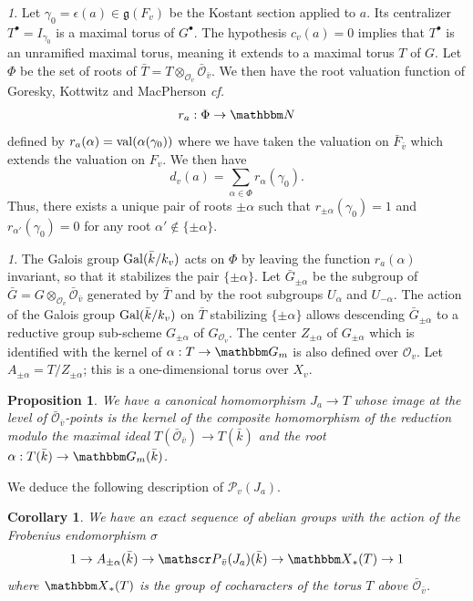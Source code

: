 \documentclass[12pt,english]{smfart}
\numberwithin{equation}{subsection}
\newtheorem{proposition}[equation]{Proposition}
\newtheorem{corollaire}[equation]{Corollary}
\theoremstyle{remark}
\newtheorem{numero}[equation]{}
\newcommand\calP{{\mathscr P}}
\newcommand\calO{{\mathscr O}}
\newcommand\frakg{{\mathfrak g}}
\newcommand\GG{{\mathbbm G}}
\newcommand\NN{{\mathbbm N}}
\newcommand\bbX{{\mathbbm X}}
\newcommand\Gal{{\rm Gal}}
\newcommand\cf{{\it cf.\ }}
\begin{document}
\begin{numero}
Let $\gamma_0=\epsilon(a)\in \frakg(F_v)$ be the Kostant section
applied to $a$. Its centralizer $T^\bullet=I_{\gamma_0}$ is a maximal
torus of $G^\bullet$. The hypothesis $c_v(a)=0$ implies that
$T^\bullet$ is an unramified maximal torus, meaning it extends to a
maximal torus $T$ of $G$. Let $\Phi$ be the set of roots of $\bar
T=T\otimes_{\calO_v} {\bar\calO_{\bar v}}$. We then have the root
valuation function of Goresky, Kottwitz and MacPherson \cf
\cite{GKM-codim}
$$r_a:\Phi\rightarrow \NN$$
defined by $r_a(\alpha)={\rm val}(\alpha(\gamma_0))$ where we have taken the
valuation on $\bar F_{\bar v}$ which extends the valuation on $F_v$. We then have
$$d_v(a)=\sum_{\alpha\in\Phi} r_\alpha(\gamma_0).$$
Thus, there exists a unique pair of roots $\pm \alpha$ such that $r_{\pm
\alpha}(\gamma_0)=1$ and $r_{\alpha'}(\gamma_0)=0$ for any root
$\alpha'\notin \{\pm \alpha\}$.
\end{numero}

\begin{numero}
The Galois group $\Gal(\bar k/ k_v)$ acts on $\Phi$ by leaving the
function $r_a(\alpha)$ invariant, so that it stabilizes the pair $\{\pm
\alpha\}$. Let $\bar G_{\pm \alpha}$ be the subgroup of $\bar
G=G\otimes_{\calO_v}{\bar \calO_{\bar v}}$ generated by $\bar T$ and by
the root subgroups $U_\alpha$ and $U_{-\alpha}$. The action of the
Galois group $\Gal(\bar k/ k_v)$ on $\bar T$ stabilizing $\{\pm\alpha\}$
allows descending $\bar G_{\pm \alpha}$ to a reductive group sub-scheme
$G_{\pm \alpha}$ of $G_{\calO_v}$. The center $Z_{\pm \alpha}$
of $G_{\pm \alpha}$ which is identified with the kernel of
$\alpha:T\rightarrow\GG_m$ is also defined over $\calO_v$. Let $A_{\pm
\alpha}=T/Z_{\pm \alpha}$; this is a one-dimensional torus over $X_v$.
\end{numero}

\begin{proposition}
We have a canonical homomorphism $J_a\rightarrow T$ whose image at the
level of $\bar\calO_{\bar v}$-points is the kernel of the composite
homomorphism of the reduction modulo the maximal ideal $T(\bar\calO_{\bar
v})\rightarrow T(\bar k)$ and the root $\alpha:T(\bar k)\rightarrow
\GG_m(\bar k)$.
\end{proposition}

We deduce the following description of $\calP_v(J_a)$.

\begin{corollaire}
We have an exact sequence of abelian groups with the action of the
Frobenius endomorphism $\sigma$
$$1 \rightarrow A_{\pm \alpha}(\bar k)\rightarrow \calP_{\bar v}(J_a)(\bar k) \rightarrow
\bbX_*(T)\rightarrow 1
$$
where $\bbX_*(T)$ is the group of cocharacters of the torus $T$ above
$\bar \calO_{\bar v}$.
\end{corollaire}
\end{document}
